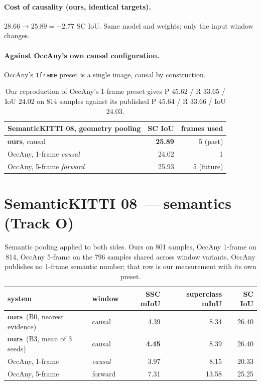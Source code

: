 \documentclass[11pt,a4paper]{article}
\newcommand{\us}{\textbf{ours}}
\newcommand{\nm}{\,---\,}
\begin{document}
\paragraph{Cost of causality (ours, identical targets).}
$28.66 \rightarrow 25.89 = \mathbf{-2.77}$ SC IoU. Same model and weights; only the input window changes.

\paragraph{Against OccAny's own causal configuration.}
OccAny's \texttt{1frame} preset is a single image, causal by construction.

\begin{table}[h]\centering
\begin{tabular}{lrr}
\toprule
SemanticKITTI 08, geometry pooling & SC IoU & frames used \\
\midrule
\us, causal & \textbf{25.89} & 5 (past) \\
OccAny, 1-frame \emph{causal} & 24.02 & 1 \\
OccAny, 5-frame \emph{forward} & 25.93 & 5 (future) \\
\bottomrule
\end{tabular}
\caption{Our reproduction of OccAny's 1-frame preset gives P $45.62$ / R $33.65$ / IoU $24.02$ on 814
samples against its published P $45.64$ / R $33.66$ / IoU $24.03$.}
\end{table}

\section{SemanticKITTI 08 \nm semantics (Track O)}

\begin{table}[h]\centering
\begin{tabular}{llrrr}
\toprule
system & window & SSC mIoU & superclass mIoU & SC IoU \\
\midrule
\us\ (B0, nearest evidence) & causal & 4.39 & 8.34 & 26.40 \\
\us\ (B3, mean of 3 seeds)  & causal & \textbf{4.45} & 8.39 & 26.40 \\
OccAny, 1-frame             & \emph{causal} & 3.97 & 8.15 & 20.33 \\
OccAny, 5-frame             & forward & 7.31 & 13.58 & 25.25 \\
\bottomrule
\end{tabular}
\caption{Semantic pooling applied to both sides. Ours on 801 samples, OccAny 1-frame on 814, OccAny
5-frame on the 796 samples shared across window variants. OccAny publishes no 1-frame semantic number;
that row is our measurement with its own preset.}
\end{table}
\end{document}
